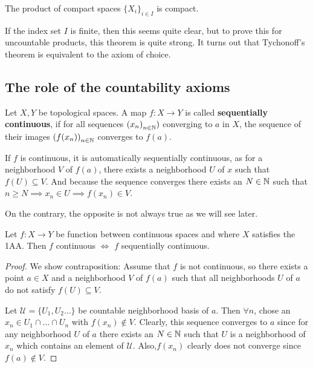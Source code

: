 \begin{thm}[Tychonoff]
The product of compact spaces $\{X_i\}_{i \in I}$ is compact.
\end{thm}
If the index set $I$ is finite, then this seems quite clear, but to prove this for uncountable products, this theorem is quite strong.
It turns out that Tychonoff's theorem is equivalent to the axiom of choice.



\subsection{The role of the countability axioms}

\begin{dfn}[]
  Let $X,Y$ be topological spaces. A map $f: X \to  Y$ is called \textbf{sequentially continuous}, if for all sequences $\left(x_{n}\right)_{n \in \mathbb{N}})$ converging to $a$ in $X$, the sequence of their images $\left(f(x_{n})\right)_{n \in \mathbb{N}}$ converges to $f(a)$.
\end{dfn}
If $f$ is continuous, it is automatically sequentially continuous, as for a neighborhood $V$ of $f(a)$, there exists a neighborhood $U$ of $x$ such that $f(U) \subseteq V$.
And because the sequence converges
there exists an $N \in \mathbb{N}$ such that $n \geq N \implies x_n \in U \implies f(x_n) \in V$.

On the contrary, the opposite is not always true as we will see later.

\begin{lem}[]
Let $f: X \to  Y$ be function between continuous spaces and where $X$ satisfies the 1AA. Then
$f$ continuous $\iff$ $f$ sequentially continuous.
\end{lem}
\begin{proof}
We show contraposition:
Assume that $f$ is not continuous, so there exists a point $a \in X$ and a neighborhood $V$ of $f(a)$ such that all neighborhoods $U$ of $a$ do not satisfy $f(U) \subseteq V$.

Let $\mathcal{U} = \{U_1,U_2\ldots\}$ be countable neighborhood basis of $a$.
Then $\forall n$, chose an $x_n \in U_1 \cap \ldots \cap U_n$ with $f(x_n) \notin V$.
Clearly, this sequence converges to $a$ since for any neighborhood $U$ of $a$ there exists an $N \in \mathbb{N}$ such that $U$ is a neighborhood of $x_n$ which contains an element of $\mathcal{U}$.
Also,$f(x_n)$ clearly does not converge since $f(a) \notin V$.
\end{proof}



